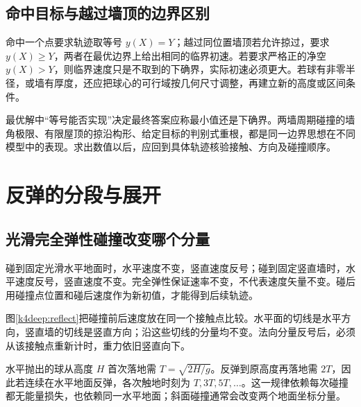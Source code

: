 \subsection{命中目标与越过墙顶的边界区别}
命中一个点要求轨迹取等号 $y(X)=Y$；越过同位置墙顶若允许掠过，要求 $y(X)\ge Y$，两者在最优边界上给出相同的临界初速。若要求严格正的净空 $y(X)>Y$，则临界速度只是不取到的下确界，实际初速必须更大。若球有非零半径，或墙有厚度，还应把球心的可行域按几何尺寸调整，再建立新的高度或区间条件。

最优解中“等号能否实现”决定最终答案应称最小值还是下确界。两墙周期碰撞的墙角极限、有限屋顶的掠沿构形、给定目标的判别式重根，都是同一边界思想在不同模型中的表现。求出数值以后，应回到具体轨迹核验接触、方向及碰撞顺序。

\section{反弹的分段与展开}
\subsection{光滑完全弹性碰撞改变哪个分量}
碰到固定光滑水平地面时，水平速度不变，竖直速度反号；碰到固定竖直墙时，水平速度反号，竖直速度不变。完全弹性保证速率不变，不代表速度矢量不变。碰后用碰撞点位置和碰后速度作为新初值，才能得到后续轨迹。

图\ref{k4deep:reflect}把碰撞前后速度放在同一个接触点比较。水平面的切线是水平方向，竖直墙的切线是竖直方向；沿这些切线的分量均不变。法向分量反号后，必须从该接触点重新计时，重力依旧竖直向下。

水平抛出的球从高度 $H$ 首次落地需 $T=\sqrt{2H/g}$。反弹到原高度再落地需 $2T$，因此若连续在水平地面反弹，各次触地时刻为 $T,3T,5T,\ldots$。这一规律依赖每次碰撞都无能量损失，也依赖同一水平地面；斜面碰撞通常会改变两个地面坐标分量。

